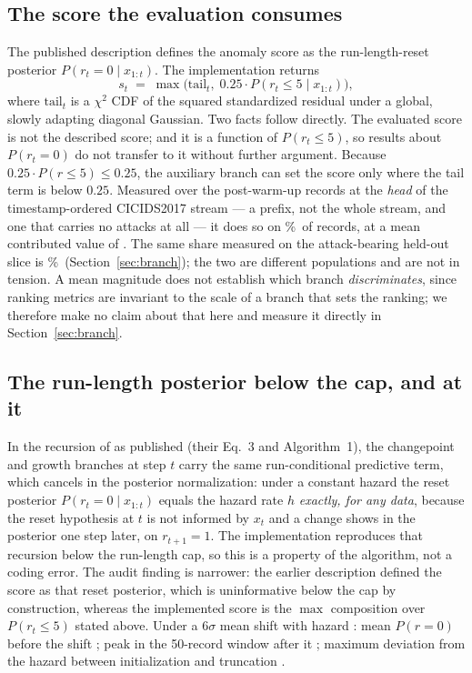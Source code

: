 \documentclass[manuscript,screen,nonacm]{acmart}
\begin{document}
\subsection{The score the evaluation consumes}
The published description defines the anomaly score as the run-length-reset
posterior $P(r_t{=}0\mid x_{1:t})$. The implementation returns
\[
s_t \;=\; \max\bigl(\text{tail}_t,\; 0.25 \cdot P(r_t \le 5 \mid x_{1:t})\bigr),
\]
where $\text{tail}_t$ is a $\chi^2$ CDF of the squared standardized residual
under a global, slowly adapting diagonal Gaussian. Two facts follow directly.
The evaluated score is not the described score; and it is a function of
$P(r_t\le5)$, so results about $P(r_t{=}0)$ do not transfer to it without
further argument. Because $0.25\cdot P(r\le5)\le0.25$, the auxiliary branch can
set the score only where the tail term is below $0.25$. Measured over the
\SThreeBindingRows{} post-warm-up records at the \emph{head} of the
timestamp-ordered CICIDS2017 stream --- a prefix, not the whole stream, and one
that carries no attacks at all --- it does so on
\SThreeChangePointBindingPct\%\ of records, at a mean contributed value of
\SThreeChangePointBindingMeanValue. The same share measured on the
attack-bearing held-out slice is \RevBranchAuxBindsHeldoutPct\%\
(Section~\ref{sec:branch}); the two are different populations and are not in
tension. A mean magnitude does
not establish which branch \emph{discriminates}, since ranking metrics are
invariant to the scale of a branch that sets the ranking; we therefore make no
claim about that here and measure it directly in
Section~\ref{sec:branch}.

\subsection{The run-length posterior below the cap, and at it}
In the recursion of \citet{adams2007bocpd} as published
(their Eq.~3 and Algorithm~1), the changepoint and growth branches at step $t$
carry the same run-conditional predictive term, which cancels in the posterior normalization: under a
constant hazard the reset posterior $P(r_t{=}0\mid x_{1:t})$ equals the hazard
rate $h$ \emph{exactly, for any data}, because the reset hypothesis at $t$ is
not informed by $x_t$ and a change shows in the posterior one step later, on
$r_{t+1}{=}1$. The implementation reproduces that recursion below the
run-length cap, so this is a property of the algorithm, not a coding error.
The audit finding is narrower: the earlier description defined the score as
that reset posterior, which is uninformative below the cap by construction,
whereas the implemented score is the $\max$ composition over $P(r_t\le5)$
stated above. Under a $6\sigma$ mean shift with
hazard \SThreeProbeHazard: mean $P(r{=}0)$ before the shift
\SThreePrZeroPreMean; peak in the 50-record window after it
\SThreePrZeroResponsePeak; maximum deviation from the hazard between
initialization and truncation \SThreePrZeroSteadyMaxDeviation.
\end{document}
